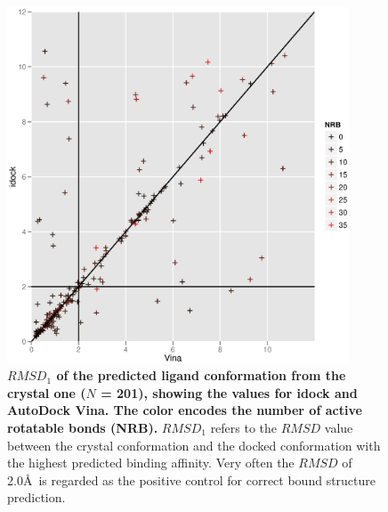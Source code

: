 \documentclass[10pt]{article}
\begin{document}
\begin{figure}[!ht]
\begin{center}
\includegraphics[width=4in]{VinaConf1RMSD-idockConf1RMSD.eps}
\end{center}
\caption{
{\bf $RMSD_1$ of the predicted ligand conformation from the crystal one ($N$ = 201), showing the values for idock and AutoDock Vina. The color encodes the number of active rotatable bonds (NRB).} $RMSD_1$ refers to the $RMSD$ value between the crystal conformation and the docked conformation with the highest predicted binding affinity. Very often the $RMSD$ of 2.0\AA\ is regarded as the positive control for correct bound structure prediction.
}
\label{VinaConf1RMSD-idockConf1RMSD}
\end{figure}
\end{document}
